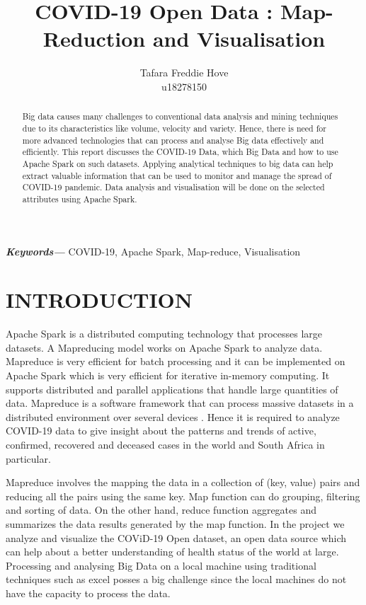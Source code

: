 \documentclass[12pt]{article}
\title{COVID-19 Open Data : Map-Reduction and Visualisation}
\author{Tafara Freddie Hove \\
        \small u18278150 \\
}
\date{}
\providecommand{\keywords}[1]
{
  \small	
  \textbf{\textit{Keywords---}} #1 
}
\begin{document}
\maketitle
\begin{abstract}


Big data  causes many challenges to conventional data analysis and mining  techniques due to its characteristics like volume, velocity and variety. Hence, there is need for more advanced technologies that can process and analyse Big data  effectively and efficiently. This report discusses the COVID-19 Data, which Big Data and how  to use Apache Spark on such datasets. Applying analytical techniques to big data can help extract valuable information that can be used to monitor and manage the spread of COVID-19  pandemic. Data analysis and visualisation will be done on the selected attributes using Apache Spark.

\end{abstract}\hspace{10pt}
\keywords{COVID-19, Apache Spark, Map-reduce, Visualisation}

\section{INTRODUCTION}

Apache Spark is a distributed computing  technology that processes large datasets. A Mapreducing model works on Apache Spark to analyze data. Mapreduce is very efficient for batch processing and it can be implemented on Apache Spark which is very efficient for iterative in-memory computing. It supports distributed and parallel applications that handle large quantities of data. Mapreduce is a software framework  that can process massive datasets in a distributed environment over several devices \cite{}. Hence it is  required to analyze COVID-19 data to give insight about the patterns and trends of active, confirmed, recovered and deceased cases in the world and South Africa in particular.

 Mapreduce involves the mapping the data in a collection of (key, value) pairs and reducing all the pairs using the same key. Map function can do grouping, filtering and sorting of data. On the other hand, reduce function aggregates and summarizes the data results generated by the map function. In the project we analyze and visualize the COViD-19 Open dataset, an open data source  which can help about a better understanding of health status of the world at large. Processing and analysing Big Data on a local machine using traditional techniques such as excel posses a big challenge since the local machines do not have the capacity to process the data.
 
\end{document}
